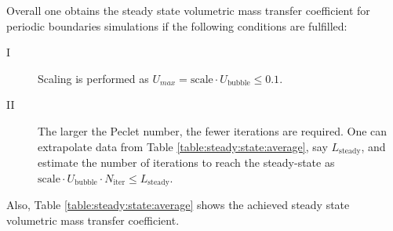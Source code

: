 \documentclass{article}
\newcommand{\ububble}{U_{\mathrm{bubble}}}
\newcommand{\cstar}{C^{*}}
\begin{document}
Overall one obtains the steady state volumetric mass transfer coefficient for
periodic boundaries simulations if the following conditions are fulfilled:
\begin{description}
\item[I] Scaling is performed as $U_{max}=\mathrm{scale}\cdot\ububble\leq 0.1$.
\item[II] The larger the Peclet number, the fewer iterations are required. One can extrapolate data from Table
\ref{table:steady:state:average}, say $L_{\mathrm{steady}}$, and estimate the  number of
iterations to reach the steady-state as $\mathrm{scale}\cdot \ububble\cdot N_{\mathrm{iter}}\leq L_{\mathrm{steady}}$. 
\end{description}
Also, Table \ref{table:steady:state:average} shows
the achieved steady state volumetric mass transfer coefficient. 
\end{document}
